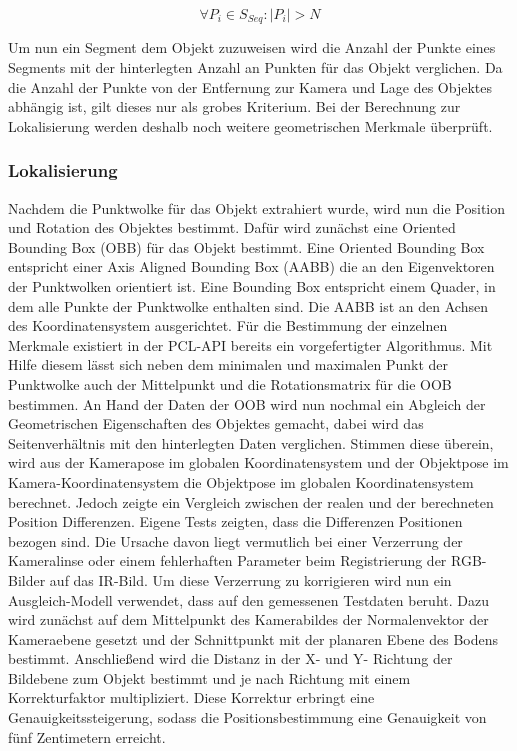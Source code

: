 \begin{equation}
\forall P_i \in S_{Seq}: |P_i| > N 
\end{equation}

Um nun ein Segment dem Objekt zuzuweisen wird die Anzahl der Punkte eines Segments mit der hinterlegten Anzahl an Punkten für das Objekt verglichen. Da die Anzahl der Punkte von der Entfernung zur Kamera und Lage des Objektes abhängig ist, gilt dieses nur als grobes Kriterium. Bei der Berechnung zur Lokalisierung werden deshalb noch weitere geometrischen Merkmale überprüft.

\subsubsection{Lokalisierung}
Nachdem die Punktwolke für das Objekt extrahiert wurde, wird nun die Position und Rotation des Objektes bestimmt. Dafür wird zunächst eine Oriented Bounding Box (OBB) für das Objekt bestimmt. Eine Oriented Bounding Box entspricht einer Axis Aligned Bounding Box (AABB) die an den Eigenvektoren der Punktwolken orientiert ist. Eine Bounding Box entspricht einem Quader, in dem alle Punkte der Punktwolke enthalten sind. Die AABB ist an den Achsen des Koordinatensystem ausgerichtet. Für die Bestimmung der einzelnen Merkmale existiert in der PCL-API bereits ein vorgefertigter Algorithmus. Mit Hilfe diesem lässt sich neben dem minimalen und maximalen Punkt der Punktwolke auch der Mittelpunkt und die Rotationsmatrix für die OOB bestimmen. An Hand der Daten der OOB wird nun nochmal ein Abgleich der Geometrischen Eigenschaften des Objektes gemacht, dabei wird das Seitenverhältnis mit den hinterlegten Daten verglichen. Stimmen diese überein, wird aus der Kamerapose im globalen Koordinatensystem und der Objektpose im Kamera-Koordinatensystem die Objektpose im globalen Koordinatensystem berechnet. Jedoch zeigte ein Vergleich zwischen der realen und der berechneten Position Differenzen. Eigene Tests zeigten, dass die Differenzen Positionen bezogen sind. Die Ursache davon liegt vermutlich bei einer Verzerrung der Kameralinse oder einem fehlerhaften Parameter beim Registrierung der RGB-Bilder auf das IR-Bild. Um diese Verzerrung zu korrigieren wird nun ein Ausgleich-Modell verwendet, dass auf den gemessenen Testdaten beruht. Dazu wird zunächst auf dem Mittelpunkt des Kamerabildes der Normalenvektor der Kameraebene gesetzt und der Schnittpunkt mit der planaren Ebene des Bodens bestimmt. Anschließend wird die Distanz in der X- und Y- Richtung der Bildebene zum Objekt bestimmt und je nach Richtung mit einem Korrekturfaktor multipliziert. Diese Korrektur erbringt eine Genauigkeitssteigerung, sodass die Positionsbestimmung eine Genauigkeit von fünf Zentimetern erreicht. 

